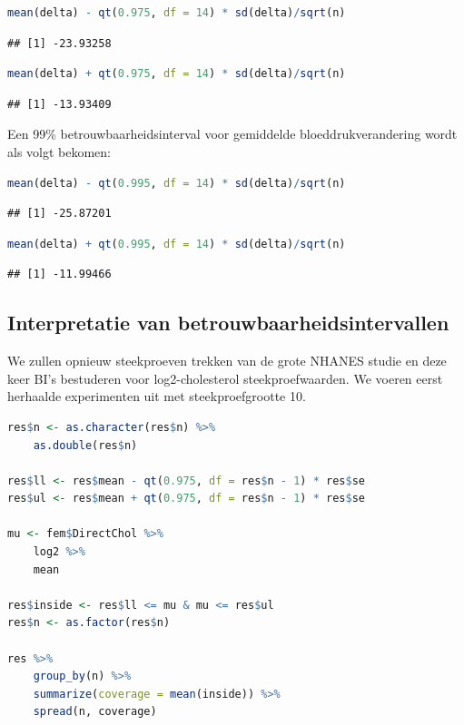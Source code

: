 \documentclass[
  12pt,dutch,coursenotes]{book}
\theoremstyle{definition}
\theoremstyle{definition}
\theoremstyle{definition}
\theoremstyle{definition}
\theoremstyle{remark}
\begin{document}
\begin{lstlisting}[language=R]
mean(delta) - qt(0.975, df = 14) * sd(delta)/sqrt(n)
\end{lstlisting}

\begin{lstlisting}
## [1] -23.93258
\end{lstlisting}

\begin{lstlisting}[language=R]
mean(delta) + qt(0.975, df = 14) * sd(delta)/sqrt(n)
\end{lstlisting}

\begin{lstlisting}
## [1] -13.93409
\end{lstlisting}

Een 99\% betrouwbaarheidsinterval voor gemiddelde bloeddrukverandering wordt als volgt bekomen:

\begin{lstlisting}[language=R]
mean(delta) - qt(0.995, df = 14) * sd(delta)/sqrt(n)
\end{lstlisting}

\begin{lstlisting}
## [1] -25.87201
\end{lstlisting}

\begin{lstlisting}[language=R]
mean(delta) + qt(0.995, df = 14) * sd(delta)/sqrt(n)
\end{lstlisting}

\begin{lstlisting}
## [1] -11.99466
\end{lstlisting}

\hypertarget{subsec:interpretBI}{%
\subsection{Interpretatie van betrouwbaarheidsintervallen}\label{subsec:interpretBI}}

We zullen opnieuw steekproeven trekken van de grote NHANES studie en deze keer BI's bestuderen voor log2-cholesterol steekproefwaarden. We voeren eerst herhaalde experimenten uit met steekproefgrootte 10.

\begin{lstlisting}[language=R]
res$n <- as.character(res$n) %>%
    as.double(res$n)

res$ll <- res$mean - qt(0.975, df = res$n - 1) * res$se
res$ul <- res$mean + qt(0.975, df = res$n - 1) * res$se

mu <- fem$DirectChol %>%
    log2 %>%
    mean

res$inside <- res$ll <= mu & mu <= res$ul
res$n <- as.factor(res$n)

res %>%
    group_by(n) %>%
    summarize(coverage = mean(inside)) %>%
    spread(n, coverage)
\end{lstlisting}
\end{document}
